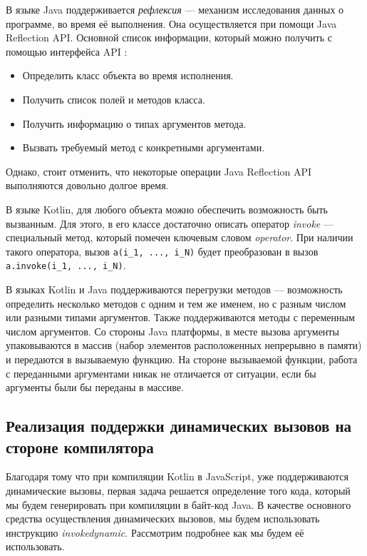 В языке Java поддерживается \textit{рефлексия} --- механизм исследования данных о программе, во время её выполнения. Она осуществляется при помощи Java Reflection API. Основной список информации, который можно получить с помощью интерфейса API \cite{java:forman2004javaReflectionsInAction}:

\begin{itemize}
    \item Определить класс объекта во время исполнения.
    \item Получить список полей и методов класса.
    \item Получить информацию о типах аргументов метода.
    \item Вызвать требуемый метод с конкретными аргументами.
\end{itemize}

Однако, стоит отменить, что некоторые операции Java Reflection API выполняются довольно долгое время.


В языке Kotlin, для любого объекта можно обеспечить возможность быть вызванным. Для этого, в его классе достаточно описать оператор \textit{invoke} --- специальный метод, который помечен ключевым словом \textit{operator}. При наличии такого оператора, вызов \texttt{a(i_1, ..., i_N)} будет преобразован в вызов \texttt{a.invoke(i_1, ..., i_N)}.

В языках Kotlin и Java поддерживаются перегрузки методов --- возможность определить несколько методов с одним и тем же именем, но с разным числом или разными типами аргументов. Также поддерживаются методы с переменным числом аргументов. Со стороны Java платформы, в месте вызова аргументы упаковываются в массив (набор элементов расположенных непрерывно в памяти) и передаются в вызываемую функцию. На стороне вызываемой функции, работа с переданными аргументами никак не отличается от ситуации, если бы аргументы были бы переданы в массиве.








\subsection{Реализация поддержки динамических вызовов на стороне компилятора}
\label{sec:compileRealization}

Благодаря тому что при компиляции Kotlin в JavaScript, уже поддерживаются динамические вызовы, первая задача решается определение того кода, который мы будем генерировать при компиляции в байт-код Java. В качестве основного средства осуществления динамических вызовов, мы будем использовать инструкцию \textit{invokedynamic}. Рассмотрим подробнее как мы будем её использовать.

